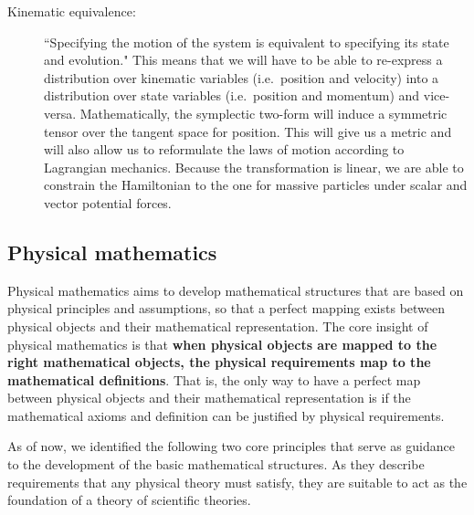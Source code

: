 \documentclass[11pt,letterpaper,fleqn]{memoir} %
\begin{document}
\begin{description}
	\item[Kinematic equivalence:] ``Specifying the motion of the system is equivalent to specifying its state and evolution." This means that we will have to be able to re-express a distribution over kinematic variables (i.e.~position and velocity) into a distribution over state variables (i.e.~position and momentum) and vice-versa. Mathematically, the symplectic two-form will induce a symmetric tensor over the tangent space for position. This will give us a metric and will also allow us to reformulate the laws of motion according to Lagrangian mechanics. Because the transformation is linear, we are able to constrain the Hamiltonian to the one for massive particles under scalar and vector potential forces.
\end{description}


\subsection{Physical mathematics}

Physical mathematics aims to develop mathematical structures that are based on physical principles and assumptions, so that a perfect mapping exists between physical objects and their mathematical representation. The core insight of physical mathematics is that \textbf{when physical objects are mapped to the right mathematical objects, the physical requirements map to the mathematical definitions}. That is, the only way to have a perfect map between physical objects and their mathematical representation is if the mathematical axioms and definition can be justified by physical requirements.

As of now, we identified the following two core principles that serve as guidance to the development of the basic mathematical structures. As they describe requirements that any physical theory must satisfy, they are suitable to act as the foundation of a theory of scientific theories.
\end{document}
